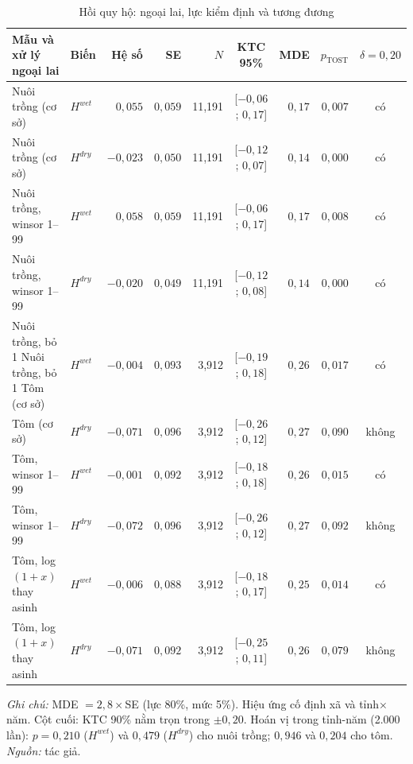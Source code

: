 \documentclass[12pt,a4paper]{article}
\begin{document}
\begin{table}[!tbp]
\centering\scriptsize
\caption{Hồi quy hộ: ngoại lai, lực kiểm định và tương đương}
\label{tab:rC}
\begin{tabular}{@{}llrrrcrrc@{}}
\toprule
Mẫu và xử lý ngoại lai & Biến & Hệ số & SE & $N$ & KTC 95\% & MDE & $p_{\text{TOST}}$ & $\delta=0{,}20$\\
\midrule
Nuôi trồng (cơ sở) & $H^{wet}$ & $0{,}055$ & $0{,}059$ & 11,191 & [$-0{,}06$; $0{,}17$] & $0{,}17$ & $0{,}007$ & có \\
Nuôi trồng (cơ sở) & $H^{dry}$ & $-0{,}023$ & $0{,}050$ & 11,191 & [$-0{,}12$; $0{,}07$] & $0{,}14$ & $0{,}000$ & có \\
Nuôi trồng, winsor 1--99 & $H^{wet}$ & $0{,}058$ & $0{,}059$ & 11,191 & [$-0{,}06$; $0{,}17$] & $0{,}17$ & $0{,}008$ & có \\
Nuôi trồng, winsor 1--99 & $H^{dry}$ & $-0{,}020$ & $0{,}049$ & 11,191 & [$-0{,}12$; $0{,}08$] & $0{,}14$ & $0{,}000$ & có \\
Nuôi trồng, bỏ 1%
Nuôi trồng, bỏ 1%
Tôm (cơ sở) & $H^{wet}$ & $-0{,}004$ & $0{,}093$ & 3,912 & [$-0{,}19$; $0{,}18$] & $0{,}26$ & $0{,}017$ & có \\
Tôm (cơ sở) & $H^{dry}$ & $-0{,}071$ & $0{,}096$ & 3,912 & [$-0{,}26$; $0{,}12$] & $0{,}27$ & $0{,}090$ & không \\
Tôm, winsor 1--99 & $H^{wet}$ & $-0{,}001$ & $0{,}092$ & 3,912 & [$-0{,}18$; $0{,}18$] & $0{,}26$ & $0{,}015$ & có \\
Tôm, winsor 1--99 & $H^{dry}$ & $-0{,}072$ & $0{,}096$ & 3,912 & [$-0{,}26$; $0{,}12$] & $0{,}27$ & $0{,}092$ & không \\
Tôm, log$(1+x)$ thay asinh & $H^{wet}$ & $-0{,}006$ & $0{,}088$ & 3,912 & [$-0{,}18$; $0{,}17$] & $0{,}25$ & $0{,}014$ & có \\
Tôm, log$(1+x)$ thay asinh & $H^{dry}$ & $-0{,}071$ & $0{,}092$ & 3,912 & [$-0{,}25$; $0{,}11$] & $0{,}26$ & $0{,}079$ & không \\
\bottomrule
\end{tabular}
\begin{minipage}{\textwidth}\footnotesize
\textit{Ghi chú:} MDE $=2{,}8\times$SE (lực 80\%, mức 5\%). Hiệu ứng cố định xã và tỉnh$\times$năm. Cột cuối: KTC 90\% nằm trọn trong $\pm0{,}20$. Hoán vị trong tỉnh-năm (2.000 lần): $p=0{,}210$ ($H^{wet}$) và $0{,}479$ ($H^{dry}$) cho nuôi trồng; $0{,}946$ và $0{,}204$ cho tôm. \textit{Nguồn:} tác giả.
\end{minipage}
\end{table}
\end{document}
